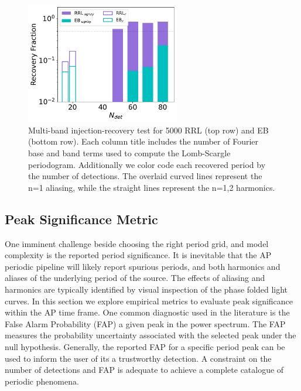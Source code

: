 \documentclass[DM,authoryear,toc]{lsstdoc}
\begin{document}

\begin{figure}
  \includegraphics[width=0.6\textwidth]{figures/multi_vs_single_rec_frac.pdf}
  \centering 
  \caption{Multi-band injection-recovery test for 5000 RRL (top row) and EB (bottom row).
Each column title includes the number of Fourier base and band terms used to compute the Lomb-Scargle periodogram.
Additionally we color code each recovered period by the number of detections.
The overlaid curved lines represent the n=1 aliasing, while the straight lines represent the n=1,2 harmonics.}
\end{figure}

\subsection{Peak Significance Metric}
One imminent challenge beside choosing the right period grid, and model complexity is the reported period significance.
It is inevitable that the AP periodic pipeline will likely report spurious periods, and both harmonics and aliases of the underlying period of the source.
The effects of aliasing and harmonics are typically identified by visual inspection of the phase folded light curves.
In this section we explore empirical metrics to evaluate peak significance within the AP time frame.
One common diagnostic used in the literature is the False Alarm Probability (FAP) a given peak in the power spectrum.
The FAP measures the probability uncertainty associated with the selected peak under the null hypothesis.
Generally, the reported FAP for a specific period peak can be used to inform the user of its a trustworthy detection.
A constraint on the number of detections and FAP is adequate to achieve a complete catalogue of periodic phenomena.
\end{document}
